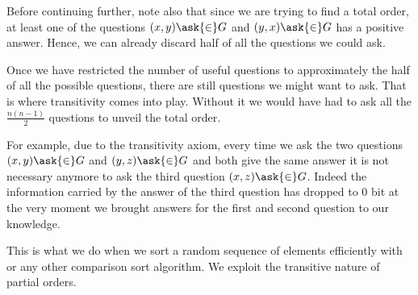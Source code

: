 Before continuing further, note also that since we are trying to find a total
order, at least one of the questions $(x, y) \ask{\in} G$ and $(y, x)
\ask{\in} G$ has a positive answer. Hence, we can already discard
half of all the questions we could ask.

Once we have restricted the number of useful questions to approximately the
half of all the possible questions, there are still  questions we
might want to ask. That is where transitivity comes into play. Without it we
would have had to ask all the $\frac{n (n-1)}{2}$ questions to unveil the total
order.

For example, due to the transitivity axiom, every time we ask the two questions
$(x, y) \ask{\in} G$ and $(y, z) \ask{\in} G$ and both give the
same answer it is not necessary anymore to ask the third question $(x, z)
\ask{\in} G$. Indeed the information carried by the answer of the
third question has dropped to 0 bit at the very moment we brought answers for
the first and second question to our knowledge.

This is what we do when we sort a random sequence of elements
efficiently with \quicksort or any other  comparison sort
algorithm. We exploit the transitive nature of partial orders.

